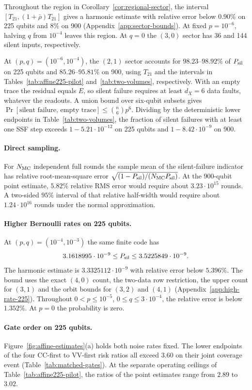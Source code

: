\documentclass[10pt,twocolumn]{article}
\theoremstyle{definition}
\begin{document}
Throughout the region in Corollary~\ref{cor:regional-sector}, the
interval $[T_{21},(1+\bar\rho)T_{21}]$ gives a harmonic estimate with
relative error below $0.90\%$ on 225 qubits and $8\%$ on 900
(Appendix~\ref{app:sector-bounds}). At fixed $p=10^{-6}$, halving $q$
from $10^{-4}$ leaves this region. At $q=0$ the $(3,0)$ sector has
36 and 144 silent inputs, respectively.

At $(p,q)=(10^{-6},10^{-4})$, the $(2,1)$ sector accounts for
$98.23$--$98.92\%$ of $P_{\rm sil}$ on 225 qubits and
$85.26$--$95.81\%$ on 900, using $T_{21}$ and the intervals in
Tables~\ref{tab:affine225-pilot} and~\ref{tab:two-volumes}, respectively.
With an empty trace the residual equals $E$, so silent failure requires at
least $d_X=6$ data faults, whatever the readouts. A union bound over
six-qubit subsets gives $\Pr[\text{silent failure, empty trace}]
\le\binom{n}{6}p^6$. Dividing by the deterministic lower endpoints in
Table~\ref{tab:two-volumes}, the fraction of silent failures with at
least one SSF step exceeds $1-5.21\cdot10^{-12}$ on 225 qubits and
$1-8.42\cdot10^{-9}$ on 900.

\paragraph{Direct sampling.}
For $N_{\rm MC}$ independent full rounds the sample mean of the
silent-failure indicator has relative root-mean-square error
$\sqrt{(1-P_{\rm sil})/(N_{\rm MC}P_{\rm sil})}$. At the 900-qubit
point estimate, $5.82\%$ relative RMS error would require about
$3.23\cdot10^{15}$ rounds. A two-sided $95\%$ interval of that
relative half-width would require about $1.24\cdot10^{16}$ rounds
under the normal approximation.

\paragraph{Higher Bernoulli rates on 225 qubits.}
At $(p,q)=(10^{-4},10^{-3})$ the same finite code has
\[
  3.1618995\cdot10^{-9}\le P_{\rm sil}\le3.5225849\cdot10^{-9}.
\]
The harmonic estimate is $3.3325112\cdot10^{-9}$ with relative error
below $5.396\%$. The bound uses the exact $(4,0)$ count, the two-data
row restriction, the upper count for $(3,1)$ and the orbit bounds
for $(3,2)$ and $(4,1)$ (Appendix~\ref{app:high-rate-225}).
Throughout $0<p\le10^{-5}$, $0\le q\le3\cdot10^{-4}$, the relative
error is below $1.352\%$. At $p=0$ the probability is zero.

\paragraph{Gate order on 225 qubits.}
Figure~\ref{fig:affine-estimates}(a) holds both noise rates fixed.
The lower endpoints of the four CC-first to VV-first risk ratios all
exceed $3.60$ on their joint coverage event
(Table~\ref{tab:matched-gates}). At the separate operating ceilings
of Table~\ref{tab:affine225-pilot}, the ratios of the point estimates
range from $2.89$ to $3.02$.
\end{document}

